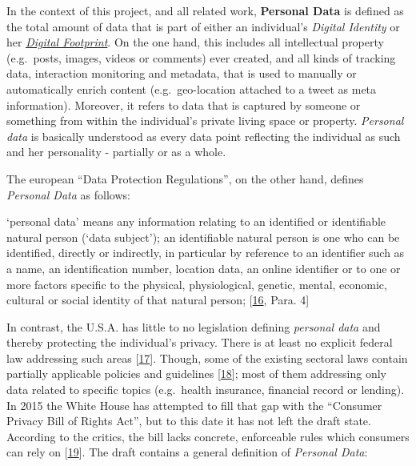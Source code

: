 \documentclass[12pt,english,a4paper,titlepage,cleardoublepage=empty,dottedtoc]{report}
\let\origquote\quote
\let\endorigquote\endquote
\renewenvironment{quote}{%
    \origquote
    \itshape
}
{\endorigquote}
\begin{document}
In the context of this project, and all related work,
\textbf{\protect\hypertarget{def--personal-data}{}{Personal Data}} is
defined as the total amount of data that is part of either an
individual's \emph{Digital Identity} or her
\emph{\protect\hyperlink{terminologies--digital-footprint}{Digital
Footprint}}. On the one hand, this includes all intellectual property
(e.g.~posts, images, videos or comments) ever created, and all kinds of
tracking data, interaction monitoring and metadata, that is used to
manually or automatically enrich content (e.g.~geo-location attached to
a tweet as meta information). Moreover, it refers to data that is
captured by someone or something from within the individual's private
living space or property. \emph{Personal data} is basically understood
as every data point reflecting the individual as such and her
personality - partially or as a whole.

The european ``Data Protection Regulations'', on the other hand, defines
\emph{\protect\hypertarget{def--personal-data-as-of-legis}{}{Personal
Data}} as follows:

\begin{quote}
`personal data' means any information relating to an identified or
identifiable natural person (`data subject'); an identifiable natural
person is one who can be identified, directly or indirectly, in
particular by reference to an identifier such as a name, an
identification number, location data, an online identifier or to one or
more factors specific to the physical, physiological, genetic, mental,
economic, cultural or social identity of that natural person;
{[}\protect\hyperlink{ref-regulation_2016_eu_general-data-protection-regulation_definition}{16},
Para. 4{]}
\end{quote}

In contrast, the U.S.A. has little to no legislation defining
\emph{personal data} and thereby protecting the individual's privacy.
There is at least no explicit federal law addressing such areas
{[}\protect\hyperlink{ref-web_2016_wikipedia_information-privacy-law_us}{17}{]}.
Though, some of the existing sectoral laws contain partially applicable
policies and guidelines
{[}\protect\hyperlink{ref-web_2016_data-protection-laws-in-the-us}{18}{]};
most of them addressing only data related to specific topics
(e.g.~health insurance, financial record or lending). In 2015 the White
House has attempted to fill that gap with the ``Consumer Privacy Bill of
Rights Act'', but to this date it has not left the draft state.
According to the critics, the bill lacks concrete, enforceable rules
which consumers can rely on
{[}\protect\hyperlink{ref-web_2015_white-house-releases-consumer-privacy-bill-draft}{19}{]}.
The draft contains a general definition of \emph{Personal Data}:
\end{document}
